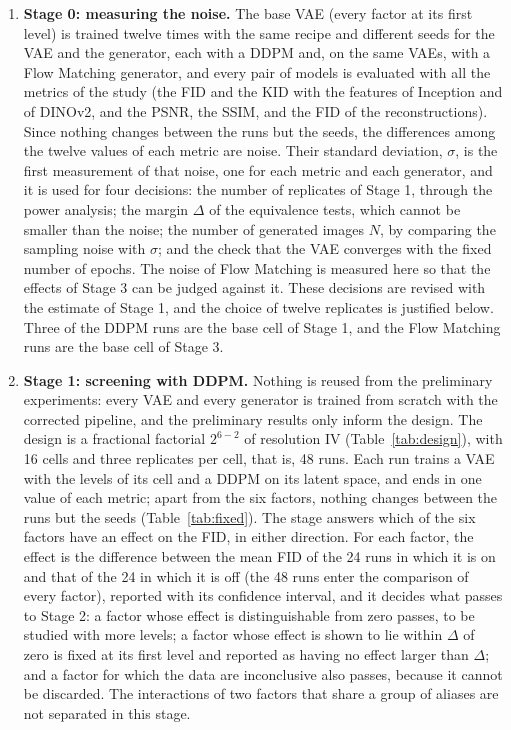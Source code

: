 \begin{enumerate}
  \item \textbf{Stage 0: measuring the noise.} The base VAE (every factor at its first level) is trained twelve times with the same recipe and different seeds for the VAE and the generator, each with a DDPM and, on the same VAEs, with a Flow Matching generator, and every pair of models is evaluated with all the metrics of the study (the FID and the KID with the features of Inception and of DINOv2, and the PSNR, the SSIM, and the FID of the reconstructions). Since nothing changes between the runs but the seeds, the differences among the twelve values of each metric are noise. Their standard deviation, $\sigma$, is the first measurement of that noise, one for each metric and each generator, and it is used for four decisions: the number of replicates of Stage 1, through the power analysis; the margin $\Delta$ of the equivalence tests, which cannot be smaller than the noise; the number of generated images $N$, by comparing the sampling noise with $\sigma$; and the check that the VAE converges with the fixed number of epochs. The noise of Flow Matching is measured here so that the effects of Stage 3 can be judged against it. These decisions are revised with the estimate of Stage 1, and the choice of twelve replicates is justified below. Three of the DDPM runs are the base cell of Stage 1, and the Flow Matching runs are the base cell of Stage 3.
  \item \textbf{Stage 1: screening with DDPM.} Nothing is reused from the preliminary experiments: every VAE and every generator is trained from scratch with the corrected pipeline, and the preliminary results only inform the design. The design is a fractional factorial $2^{6-2}$ of resolution IV (Table~\ref{tab:design}), with 16 cells and three replicates per cell, that is, 48 runs. Each run trains a VAE with the levels of its cell and a DDPM on its latent space, and ends in one value of each metric; apart from the six factors, nothing changes between the runs but the seeds (Table~\ref{tab:fixed}). The stage answers which of the six factors have an effect on the FID, in either direction. For each factor, the effect is the difference between the mean FID of the 24 runs in which it is on and that of the 24 in which it is off (the 48 runs enter the comparison of every factor), reported with its confidence interval, and it decides what passes to Stage 2: a factor whose effect is distinguishable from zero passes, to be studied with more levels; a factor whose effect is shown to lie within $\Delta$ of zero is fixed at its first level and reported as having no effect larger than $\Delta$; and a factor for which the data are inconclusive also passes, because it cannot be discarded. The interactions of two factors that share a group of aliases are not separated in this stage.

\end{enumerate}
